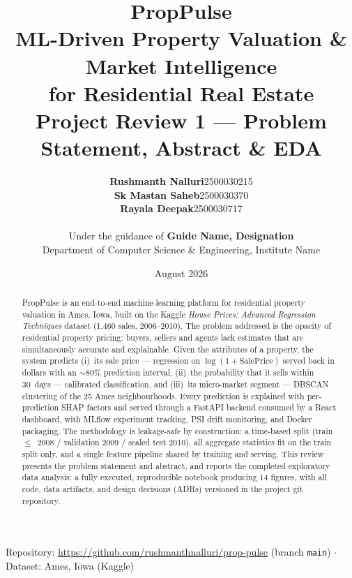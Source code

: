 \documentclass[11pt,a4paper]{article}
\title{\textcolor{propnavy}{\textbf{PropPulse}}\\[4pt]
\large ML-Driven Property Valuation \& Market Intelligence\\
for Residential Real Estate\\[10pt]
\normalsize Project Review 1 --- Problem Statement, Abstract \& EDA}
\author{%
\begin{tabular}{ll}
\textbf{Rushmanth Nalluri} & 2500030215 \\
\textbf{Sk Mastan Saheb} & 2500030370 \\
\textbf{Rayala Deepak} & 2500030717 \\
\end{tabular}\\[12pt]
Under the guidance of \textbf{Guide Name, Designation}\\
Department of Computer Science \& Engineering, Institute Name}
\date{August 2026}
\begin{document}
\maketitle
\thispagestyle{empty}

\begin{center}
\small Repository: \url{https://github.com/rushmanthnalluri/prop-pulse} \quad
(branch \texttt{main}) \quad$\cdot$\quad Dataset: Ames, Iowa (Kaggle)
\end{center}

\begin{abstract}
\noindent
PropPulse is an end-to-end machine-learning platform for residential property
valuation in Ames, Iowa, built on the Kaggle \emph{House Prices: Advanced
Regression Techniques} dataset (1{,}460 sales, 2006--2010). The problem
addressed is the opacity of residential property pricing: buyers, sellers and
agents lack estimates that are simultaneously accurate and explainable. Given
the attributes of a property, the system predicts (i)~its sale price ---
regression on $\log(1+\text{SalePrice})$ served back in dollars with an
$\sim$80\% prediction interval, (ii)~the probability that it sells within
30~days --- calibrated classification, and (iii)~its micro-market segment ---
DBSCAN clustering of the 25 Ames neighbourhoods. Every prediction is explained
with per-prediction SHAP factors and served through a FastAPI backend consumed
by a React dashboard, with MLflow experiment tracking, PSI drift monitoring,
and Docker packaging. The methodology is leakage-safe by construction: a
time-based split (train $\le$~2008 / validation 2009 / sealed test 2010), all
aggregate statistics fit on the train split only, and a single feature pipeline
shared by training and serving. This review presents the problem statement and
abstract, and reports the completed exploratory data analysis: a fully
executed, reproducible notebook producing 14 figures, with all code, data
artifacts, and design decisions (ADRs) versioned in the project git repository.
\end{abstract}

\end{document}
